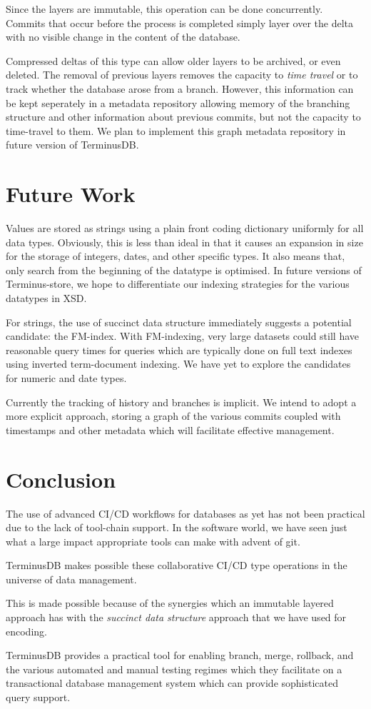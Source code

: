\documentclass[10pt, a4paper, twocolumn]{article} %
\begin{document}
Since the layers are immutable, this operation can be done
concurrently. Commits that occur before the process is completed simply
layer over the delta with no visible change in the content of
the database.

Compressed deltas of this type can allow older layers to be archived,
or even deleted. The removal of previous layers removes the capacity
to {\em time travel} or to track whether the database arose from a
branch. However, this information can be kept seperately in a metadata
repository allowing memory of the branching structure and other
information about previous commits, but not the capacity to
time-travel to them. We plan to implement this graph metadata
repository in future version of TerminusDB.

\section{Future Work}

Values are stored as strings using a plain front coding dictionary
uniformly for all data types. Obviously, this is less than ideal in
that it causes an expansion in size for the storage of integers,
dates, and other specific types. It also means that, only search from
the beginning of the datatype is optimised. In future versions of
Terminus-store, we hope to differentiate our indexing strategies for
the various datatypes in XSD.

For strings, the use of succinct data structure immediately suggests a
potential candidate: the
FM-index\autocite{Ferragina:2005:ICT:1082036.1082039}. With FM-indexing,
very large datasets could still have reasonable query times for
queries which are typically done on full text indexes using inverted
term-document indexing. We have yet to explore the candidates for
numeric and date types.

Currently the tracking of history and branches is implicit. We intend
to adopt a more explicit approach, storing a graph of the various
commits coupled with timestamps and other metadata which will
facilitate effective management.

\section{Conclusion}

The use of advanced CI/CD workflows for databases as yet has not been
practical due to the lack of tool-chain support. In the software world,
we have seen just what a large impact appropriate tools can make with
advent of git.

TerminusDB makes possible these collaborative CI/CD type operations in
the universe of data management.

This is made possible because of the synergies which an immutable
layered approach has with the {\em succinct data structure} approach
that we have used for encoding.

TerminusDB provides a practical tool for enabling branch, merge,
rollback, and the various automated and manual testing regimes which
they facilitate on a transactional database management system which
can provide sophisticated query support.

\printbibliography[title={Bibliography}]
\end{document}
